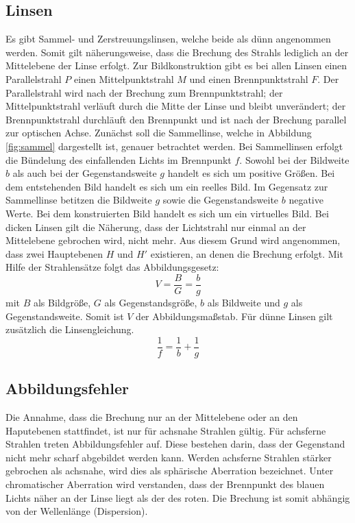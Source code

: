 \subsection{Linsen}
Es gibt Sammel- und Zerstreuungslinsen, welche beide als dünn angenommen werden. Somit gilt näherungsweise, dass die Brechung des Strahls lediglich an der Mittelebene der Linse erfolgt. Zur Bildkonstruktion gibt es bei allen Linsen einen Parallelstrahl $P$ einen Mittelpunktstrahl $M$ und einen Brennpunktstrahl $F$. Der Parallelstrahl wird nach der Brechung zum Brennpunktstrahl; der Mittelpunktstrahl verläuft durch die Mitte der Linse und bleibt unverändert; der Brennpunktstrahl durchläuft den Brennpunkt und ist nach der Brechung parallel zur optischen Achse.
Zunächst soll die Sammellinse, welche in Abbildung \ref{fig:sammel} dargestellt ist, genauer betrachtet werden.
 Bei Sammellinsen erfolgt die Bündelung des einfallenden Lichts im Brennpunkt $f$. Sowohl bei der Bildweite $b$ als auch bei der Gegenstandsweite $g$ handelt es sich um positive Größen. Bei dem entstehenden Bild handelt es sich um ein reelles Bild.
Im Gegensatz zur Sammellinse betitzen die Bildweite $g$ sowie die Gegenstandsweite $b$ negative Werte. Bei dem konstruierten Bild handelt es sich um ein virtuelles Bild.
Bei dicken Linsen gilt die Näherung, dass der Lichtstrahl nur einmal an der Mittelebene gebrochen wird, nicht mehr. Aus diesem Grund wird angenommen, dass zwei Hauptebenen $H$ und $H'$ existieren, an denen die Brechung erfolgt.
Mit Hilfe der Strahlensätze folgt das Abbildungsgesetz:
\begin{equation}
  \label{eqn:abbildung}
  V=\frac{B}{G}=\frac{b}{g}
\end{equation}
mit $B$ als Bildgröße, $G$ als Gegenstandsgröße, $b$ als Bildweite und $g$ als Gegenstandsweite. Somit ist $V$ der Abbildungsmaßstab.
Für dünne Linsen gilt zusätzlich die Linsengleichung.
\begin{equation}
  \label{eqn:linse}
  \frac{1}{f}=\frac{1}{b}+\frac{1}{g}
\end{equation}

\subsection{Abbildungsfehler}
Die Annahme, dass die Brechung nur an der Mittelebene oder an den Haputebenen stattfindet, ist nur für achsnahe Strahlen gültig. Für achsferne Strahlen treten Abbildungsfehler auf. Diese bestehen darin, dass der Gegenstand nicht mehr scharf abgebildet werden kann. Werden achsferne Strahlen stärker gebrochen als achsnahe, wird dies als sphärische Aberration bezeichnet.
Unter chromatischer Aberration wird verstanden, dass der Brennpunkt des blauen Lichts näher an der Linse liegt als der des roten. Die Brechung ist somit abhängig von der Wellenlänge (Dispersion).

